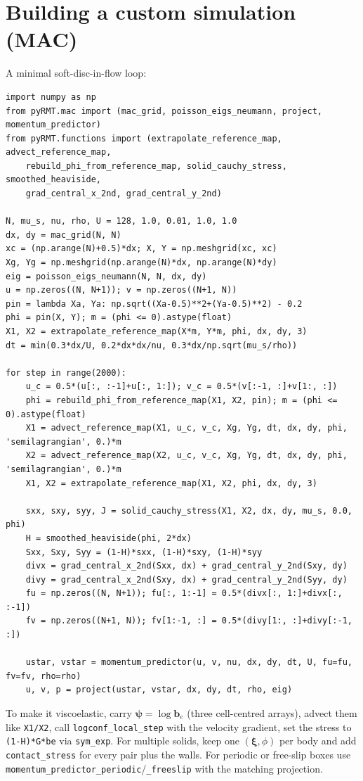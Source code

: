 \documentclass[11pt]{article}
\newcommand{\bten}{\bm{b}}
\newcommand{\xiv}{\bm{\xi}}
\begin{document}
\section{Building a custom simulation (MAC)}
A minimal soft-disc-in-flow loop:
\begin{lstlisting}
import numpy as np
from pyRMT.mac import (mac_grid, poisson_eigs_neumann, project, momentum_predictor)
from pyRMT.functions import (extrapolate_reference_map, advect_reference_map,
    rebuild_phi_from_reference_map, solid_cauchy_stress, smoothed_heaviside,
    grad_central_x_2nd, grad_central_y_2nd)

N, mu_s, nu, rho, U = 128, 1.0, 0.01, 1.0, 1.0
dx, dy = mac_grid(N, N)
xc = (np.arange(N)+0.5)*dx; X, Y = np.meshgrid(xc, xc)
Xg, Yg = np.meshgrid(np.arange(N)*dx, np.arange(N)*dy)
eig = poisson_eigs_neumann(N, N, dx, dy)
u = np.zeros((N, N+1)); v = np.zeros((N+1, N))
pin = lambda Xa, Ya: np.sqrt((Xa-0.5)**2+(Ya-0.5)**2) - 0.2
phi = pin(X, Y); m = (phi <= 0).astype(float)
X1, X2 = extrapolate_reference_map(X*m, Y*m, phi, dx, dy, 3)
dt = min(0.3*dx/U, 0.2*dx*dx/nu, 0.3*dx/np.sqrt(mu_s/rho))

for step in range(2000):
    u_c = 0.5*(u[:, :-1]+u[:, 1:]); v_c = 0.5*(v[:-1, :]+v[1:, :])
    phi = rebuild_phi_from_reference_map(X1, X2, pin); m = (phi <= 0).astype(float)
    X1 = advect_reference_map(X1, u_c, v_c, Xg, Yg, dt, dx, dy, phi, 'semilagrangian', 0.)*m
    X2 = advect_reference_map(X2, u_c, v_c, Xg, Yg, dt, dx, dy, phi, 'semilagrangian', 0.)*m
    X1, X2 = extrapolate_reference_map(X1, X2, phi, dx, dy, 3)

    sxx, sxy, syy, J = solid_cauchy_stress(X1, X2, dx, dy, mu_s, 0.0, phi)
    H = smoothed_heaviside(phi, 2*dx)
    Sxx, Sxy, Syy = (1-H)*sxx, (1-H)*sxy, (1-H)*syy
    divx = grad_central_x_2nd(Sxx, dx) + grad_central_y_2nd(Sxy, dy)
    divy = grad_central_x_2nd(Sxy, dx) + grad_central_y_2nd(Syy, dy)
    fu = np.zeros((N, N+1)); fu[:, 1:-1] = 0.5*(divx[:, 1:]+divx[:, :-1])
    fv = np.zeros((N+1, N)); fv[1:-1, :] = 0.5*(divy[1:, :]+divy[:-1, :])

    ustar, vstar = momentum_predictor(u, v, nu, dx, dy, dt, U, fu=fu, fv=fv, rho=rho)
    u, v, p = project(ustar, vstar, dx, dy, dt, rho, eig)
\end{lstlisting}
To make it viscoelastic, carry $\bm\psi=\log\bten_e$ (three cell-centred arrays),
advect them like \texttt{X1/X2}, call \texttt{logconf\_local\_step} with the velocity
gradient, set the stress to \texttt{(1-H)*G*be} via \texttt{sym\_exp}. For multiple
solids, keep one $(\xiv,\phi)$ per body and add \texttt{contact\_stress} for every
pair plus the walls. For periodic or free-slip boxes use
\texttt{momentum\_predictor\_periodic}/\texttt{\_freeslip} with the matching
projection.
\end{document}
